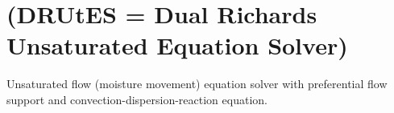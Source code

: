 \section{(\+D\+R\+Ut\+E\+S = Dual Richards\textquotesingle{} Unsaturated Equation Solver)}\label{index_Introduction}
Unsaturated flow (moisture movement) equation solver with preferential flow support and convection-\/dispersion-\/reaction equation. 